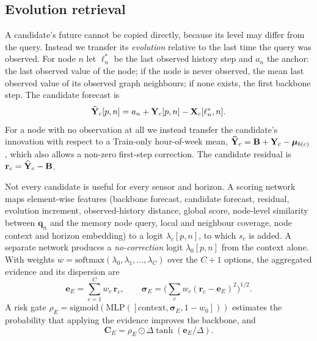 \subsection{Evolution retrieval}
\label{sec:evolution}
A candidate's future cannot be copied directly, because its level may differ from the query. Instead we transfer its \emph{evolution} relative to the last time the query was observed. For node $n$ let $\ell^\ast_n$ be the last observed history step and $a_n$ the anchor: the last observed value of the node; if the node is never observed, the mean last observed value of its observed graph neighbours; if none exists, the first backbone step. The candidate forecast is
\begin{equation}
\widehat{\mathbf{Y}}_c[p,n]=a_n+\mathbf{Y}_c[p,n]-\mathbf{X}_c[\ell^\ast_n,n] .
\end{equation}
For a node with no observation at all we instead transfer the candidate's innovation with respect to a Train-only hour-of-week mean, $\widehat{\mathbf{Y}}_c=\mathbf{B}+\mathbf{Y}_c-\bm\mu_{b(c)}$, which also allows a non-zero first-step correction. The candidate residual is $\mathbf{r}_c=\widehat{\mathbf{Y}}_c-\mathbf{B}$.

Not every candidate is useful for every sensor and horizon. A scoring network maps element-wise features (backbone forecast, candidate forecast, residual, evolution increment, observed-history distance, global score, node-level similarity between $\mathbf{q}_n$ and the memory node query, local and neighbour coverage, node context and horizon embedding) to a logit $\lambda_c[p,n]$, to which $s_c$ is added. A separate network produces a \emph{no-correction} logit $\lambda_0[p,n]$ from the context alone. With weights $w=\mathrm{softmax}(\lambda_0,\lambda_1,\dots,\lambda_C)$ over the $C+1$ options, the aggregated evidence and its dispersion are
\begin{equation}
\mathbf{e}_E=\sum_{c=1}^C w_c\,\mathbf{r}_c,\qquad \bm\sigma_E=\Big(\sum_c w_c(\mathbf{r}_c-\mathbf{e}_E)^2\Big)^{1/2}.
\end{equation}
A risk gate $\rho_E=\mathrm{sigmoid}(\mathrm{MLP}([\text{context},\bm\sigma_E,1-w_0]))$ estimates the probability that applying the evidence improves the backbone, and
\begin{equation}
\mathbf{C}_E=\rho_E\odot\Delta\tanh(\mathbf{e}_E/\Delta).
\end{equation}

